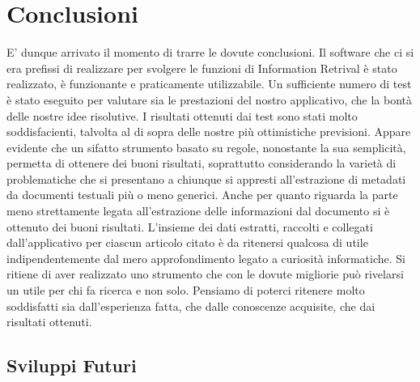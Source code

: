 \section{Conclusioni} \label{conclusioni}
E' dunque arrivato il momento di trarre le dovute conclusioni. Il software che ci si era prefissi di realizzare per svolgere le funzioni di Information Retrival è stato realizzato, è funzionante e praticamente utilizzabile. Un sufficiente numero di test è stato eseguito per valutare sia le prestazioni del nostro applicativo, che la bontà delle nostre idee risolutive. I risultati ottenuti dai test sono stati molto soddisfacienti, talvolta al di sopra delle nostre  più ottimistiche previsioni. Appare evidente che un sifatto strumento basato su regole, nonostante la sua semplicità, permetta di ottenere dei buoni risultati, soprattutto considerando la varietà di problematiche che si presentano a chiunque si appresti all'estrazione di metadati da documenti testuali più o meno generici. Anche per quanto riguarda la parte meno strettamente legata all'estrazione delle informazioni dal documento si è ottenuto dei buoni risultati. L'insieme dei dati estratti, raccolti e collegati dall'applicativo per ciascun articolo citato è da ritenersi qualcosa di utile indipendentemente dal mero approfondimento legato a curiosità informatiche. Si ritiene di aver realizzato uno strumento che con le dovute migliorie può rivelarsi un utile per chi fa ricerca e non solo. Pensiamo di poterci ritenere molto soddisfatti sia dall'esperienza fatta, che dalle conoscenze acquisite, che dai risultati ottenuti. 

\subsection{Sviluppi Futuri}\label{sviluppifuturi}

